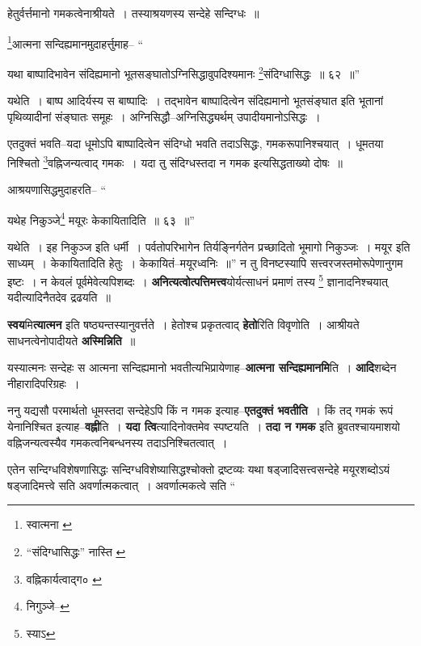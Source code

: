 \documentclass[article,12pt,a4paper]{memoir}
\begin{document}
	हेतुर्वर्त्तमानो गमकत्वेनाश्रीयते । तस्याश्रयणस्य सन्देहे सन्दिग्धः ॥ 
	  
	\footnote{स्वात्मना \cite{dp-msA} \cite{dp-msB} \cite{dp-msC} \cite{dp-msD} \cite{dp-edP} \cite{dp-edE} \cite{dp-edH} \cite{dp-edN}}आत्मना सन्दिह्यमानमुदाहर्त्तुमाह-- “
	  
	यथा बाष्पादिभावेन संदिह्यमानो भूतसङ्घातोऽग्निसिद्धावुपदिश्यमानः \footnote{“संदिग्धासिद्धः” नास्ति \cite{dp-msC}}संदिग्धासिद्धः ॥ ६२ ॥” 
	  
	यथेति । बाष्प आदिर्यस्य स बाष्पादिः । तद्भावेन बाष्पादित्वेन संदिह्यमानो भूतसंङ्घात इति भूतानां पृथिव्यादीनां संङ्घातः समूहः । अग्निसिद्धौ--अग्निसिद्ध्यर्थम् उपादीयमानोऽसिद्धः । 
	  
	एतदुक्तं भवति--यदा धूमोऽपि बाष्पादित्वेन संदिग्धो भवति तदाऽसिद्धः, गमकरूपानिश्चयात् । धूमतया निश्चितो \footnote{वह्निकार्यत्वाद्ग० \cite{dp-msC}}वह्निजन्यत्वाद् गमकः । यदा तु संदिग्धस्तदा न गमक इत्यसिद्धताख्यो दोषः ॥ 
	  
	आश्रयणासिद्धमुदाहरति-- “
	  
	यथेह निकुञ्जे\footnote{निगुञ्जे--\cite{dp-msC}} मयूरः केकायितादिति ॥ ६३ ॥” 
	  
	यथेति । इह निकुञ्ज इति धर्मी । पर्वतोपरिभागेन तिर्यङ्निर्गतेन प्रच्छादितो भूमागो निकुञ्जः । मयूर इति साध्यम् । केकायितादिति हेतुः । केकायितं--मयूरध्वनिः ॥” न तु विनष्टस्यापि सत्त्वरजस्तमोरूपेणानुगम इष्टः । न केवलं पूर्वमेवेत्यपिशब्दः । \textbf{अनित्यत्वोत्पत्तिमत्त्व}योर्यत्साधनं प्रमाणं तस्य \footnote{स्याऽ} ज्ञानादनिश्चयात् यदीत्यादिनैतदेव द्रढयति ॥
	\pend
      

	  \pstart \textbf{स्वय}मि\textbf{त्यात्मन} इति षष्ठ्यन्तस्यानुवर्त्तते । हेतोश्च प्रकृतत्वाद् \textbf{हेतो}रिति विवृणोति । आश्रीयते साधनत्वेनोपादीयते \textbf{अस्मिन्निति} ॥
	\pend
      

	  \pstart यस्यात्मनः सन्देहः स आत्मना सन्दिह्यमानो भवतीत्यभिप्रायेणाह--\textbf{आत्मना सन्दिह्यमानमि}ति । \textbf{आदि}शब्देन नीहारादिपरिग्रहः ।
	\pend
      

	  \pstart ननु यद्यसौ परमार्थतो धूमस्तदा सन्देहेऽपि किं न गमक इत्याह--\textbf{एतदुक्तं भवतीति} । किं तद् गमकं रूपं येनानिश्चित इत्याह--\textbf{वह्नी}ति । \textbf{यदा त्वि}त्यादिनोक्तमेव स्पष्टयति । \textbf{तदा न गमक} इति ब्रुवतश्चायमाशयो वह्निजन्यत्वस्यैव गमकत्वनिबन्धनस्य तदाऽनिश्चितत्वात् ।
	\pend
      

	  \pstart एतेन सन्दिग्धविशेषणासिद्धः सन्दिग्धविशेष्यासिद्धश्चोक्तो द्रष्टव्यः \leavevmode{} यथा षड्जादिसत्त्वसन्देहे मयूरशब्दोऽयं षड्जादिमत्त्वे सति अवर्णात्मकत्वात् । अवर्णात्मकत्वे सति  \leavevmode{} “
	  
\end{document}
